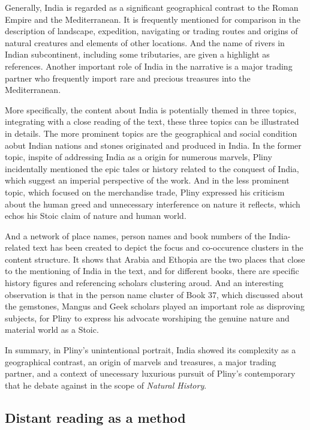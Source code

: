 \documentclass[
  12pt,
]{article}
\begin{document}
Generally, India is regarded as a significant geographical contrast to
the Roman Empire and the Mediterranean. It is frequently mentioned for
comparison in the description of landscape, expedition, navigating or
trading routes and origins of natural creatures and elements of other
locations. And the name of rivers in Indian subcontinent, including some
tributaries, are given a highlight as references. Another important role
of India in the narrative is a major trading partner who frequently
import rare and precious treasures into the Mediterranean.

More specifically, the content about India is potentially themed in
three topics, integrating with a close reading of the text, these three
topics can be illustrated in details. The more prominent topics are the
geographical and social condition aobut Indian nations and stones
originated and produced in India. In the former topic, inspite of
addressing India as a origin for numerous marvels, Pliny incidentally
mentioned the epic tales or history related to the conquest of India,
which suggest an imperial perspective of the work. And in the less
prominent topic, which focused on the merchandise trade, Pliny expressed
his criticism about the human greed and unnecessary interference on
nature it reflects, which echos his Stoic claim of nature and human
world.

And a network of place names, person names and book numbers of the
India-related text has been created to depict the focus and co-occurence
clusters in the content structure. It shows that Arabia and Ethopia are
the two places that close to the mentioning of India in the text, and
for different books, there are specific history figures and referencing
scholars clustering aroud. And an interesting observation is that in the
person name cluster of Book 37, which discussed about the gemstones,
Mangus and Geek scholars played an important role as disproving
subjects, for Pliny to express his advocate worshiping the genuine
nature and material world as a Stoic.

In summary, in Pliny's unintentional portrait, India showed its
complexity as a geographical contrast, an origin of marvels and
treasures, a major trading partner, and a context of unecessary
luxurious pursuit of Pliny's contemporary that he debate against in the
scope of \emph{Natural History}.

\hypertarget{distant-reading-as-a-method}{%
\subsection{Distant reading as a
method}\label{distant-reading-as-a-method}}
\end{document}

